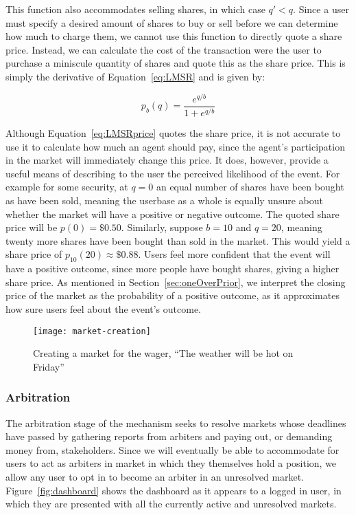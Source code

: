 \documentclass[10pt,a4paper]{article}
\theoremstyle{plain}
\theoremstyle{definition}
\begin{document}
This function also accommodates selling shares, in which case $q'<q$.  Since a
user must specify a desired amount of shares to buy or sell before we can
determine how much to charge them, we cannot use this function to directly
quote a share price. Instead, we can calculate the cost of the transaction were
the user to purchase a miniscule quantity of shares and quote this as the share
price. This is simply the derivative of Equation~\ref{eq:LMSR} and is given by:

\begin{equation}
	\label{eq:LMSRprice}
	p_b(q) = \frac{ e^{q/b} }{ 1 + e^{q/b} }
\end{equation}

Although Equation~\ref{eq:LMSRprice} quotes the share price, it is not accurate
to use it to calculate how much an agent should pay, since the agent's
participation in the market will immediately change this price. It does,
however, provide a useful means of describing to the user the perceived
likelihood of the event. For example for some security, at $q=0$ an equal
number of shares have been bought as have been sold, meaning the userbase as a
whole is equally unsure about whether the market will have a positive or
negative outcome. The quoted share price will be $p(0)=\$0.50$.  Similarly,
suppose $b=10$ and $q=20$, meaning twenty more shares have been bought than
sold in the market. This would yield a share price of $p_{10}(20) \approx
\$0.88$. Users feel more confident that the event will have a positive outcome,
since more people have bought shares, giving a higher share price. As mentioned
in Section~\ref{sec:oneOverPrior}, we interpret the closing price of the market
as the probability of a positive outcome, as it approximates how sure users
feel about the event's outcome.

\begin{figure}[h]
	\centering
	\texttt{[image: market-creation]}
	\caption{Creating a market for the wager, ``The weather will be hot on
	Friday''}
	\label{fig:marketCreation}
\end{figure}

\subsubsection{Arbitration}

\label{sec:arbitration}

The arbitration stage of the mechanism seeks to resolve markets whose deadlines
have passed by gathering reports from arbiters and paying out, or demanding
money from, stakeholders. Since we will eventually be able to accommodate for
users to act as arbiters in market in which they themselves hold a position, we
allow any user to opt in to become an arbiter in an unresolved market.
Figure~\ref{fig:dashboard} shows the dashboard as it appears to a logged in
user, in which they are presented with all the currently active and unresolved
markets. 
\end{document}
